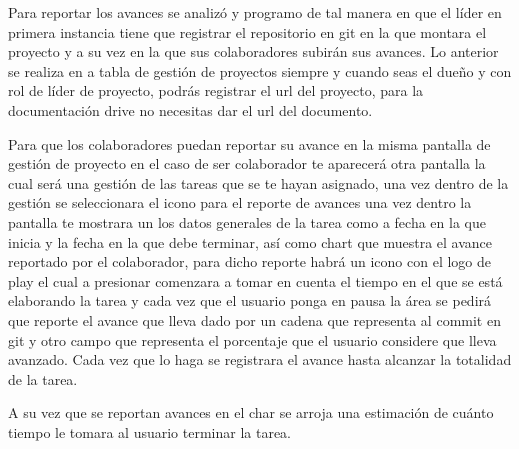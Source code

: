 Para reportar los avances se analizó y programo de tal manera en que el líder en primera instancia tiene que registrar el repositorio en git en la que montara el proyecto y a su vez en la que sus colaboradores subirán sus avances. Lo anterior se realiza en a tabla de gestión de proyectos siempre y cuando seas el dueño y con rol de líder de proyecto, podrás registrar el url del proyecto, para la documentación drive no necesitas dar el url del documento. 

Para que los colaboradores puedan reportar su avance en la misma pantalla de gestión de proyecto en el caso de ser colaborador te aparecerá otra pantalla la cual será una gestión de las tareas que se te hayan asignado, una vez dentro de la gestión se seleccionara el icono para el reporte de avances una vez dentro la pantalla te mostrara un los datos generales de la tarea como a fecha en la que inicia y la fecha en la que debe terminar, así como chart que muestra el avance reportado por el colaborador, para dicho reporte habrá un icono con el logo de play el cual a presionar comenzara a tomar en cuenta el tiempo en el que se está elaborando la tarea y cada vez que el usuario ponga en pausa la área se pedirá que reporte el avance que lleva dado por un cadena que representa al commit en git y otro campo que representa el porcentaje que el usuario considere que lleva avanzado. Cada vez que lo haga se registrara el avance hasta alcanzar la totalidad de la tarea. 

A su vez que se reportan avances en el char se arroja una estimación de cuánto tiempo le tomara al usuario terminar la tarea. 




